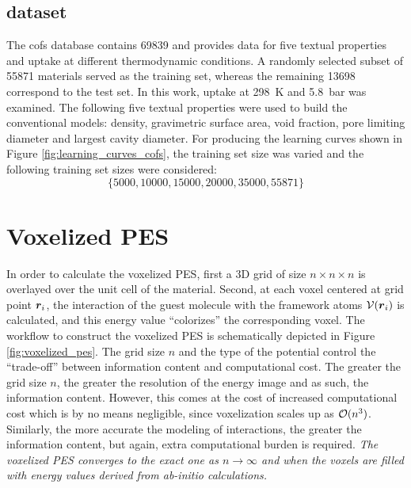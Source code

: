 \subsection{ dataset}

The \glspl{cof} database contains \num{69839} and provides data for five textual
properties and  uptake at different thermodynamic
conditions. A randomly selected subset of
\num{55871} materials served as the training set, whereas the remaining
\num{13698} correspond to the test set. In this work,  uptake at
\SI{298}{\kelvin} and \SI{5.8}{\bar} was examined. The following five textual properties
were used to build the conventional models: density, gravimetric surface area,
void fraction, pore limiting diameter and largest cavity diameter.
For producing the learning curves shown in Figure
\ref{fig:learning_curves_cofs}, the training set size was varied and the following
training set sizes were considered:
\begin{equation}
	\{
		\num{5000}, \num{10000}, \num{15000},
		\num{20000}, \num{35000}, \num{55871}
	\}
\end{equation}

\section{Voxelized PES}
\label{sec:voxelized_pes}

In order to calculate the voxelized PES, first a 3D grid of size $n\times
n\times n$ is overlayed over the unit cell of the material. Second, at each
voxel centered at grid point $\boldsymbol{r}_i$, the interaction of the guest molecule
with the framework atoms $\mathcal{V}(\boldsymbol{r}_i)$ is calculated, and this energy
value ``colorizes'' the corresponding voxel. The workflow to construct the
voxelized PES is schematically depicted in Figure \ref{fig:voxelized_pes}. The
grid size $n$ and the type of the potential control the ``trade-off'' between
information content and computational
cost. The greater the grid size $n$, the greater the
resolution of the energy image and as such, the information content. However,
this comes at the cost of increased computational cost which is by no means
negligible, since voxelization scales up as $\mathcal{O}(n^3)$.
Similarly, the more accurate the modeling of interactions, the greater the
information content, but again, extra computational burden is required.
\emph{The voxelized PES converges to the exact one as $n \to \infty$ and when
the voxels are filled with energy values derived from ab-initio
calculations.}

